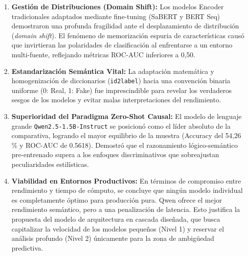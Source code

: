 \begin{enumerate}
    \item \textbf{Gestión de Distribuciones (Domain Shift):} Los modelos Encoder tradicionales adaptados mediante fine-tuning (SaBERT y BERT Seq) demostraron una profunda fragilidad ante el desplazamiento de distribución (\textit{domain shift}). El fenómeno de memorización espuria de características causó que invirtieran las polaridades de clasificación al enfrentarse a un entorno multi-fuente, reflejando métricas ROC-AUC inferiores a 0,50.
    \item \textbf{Estandarización Semántica Vital:} La adaptación matemática y homogenización de diccionarios (\texttt{id2label}) hacia una convención binaria uniforme (0: Real, 1: Fake) fue imprescindible para revelar los verdaderos sesgos de los modelos y evitar malas interpretaciones del rendimiento.
    \item \textbf{Superioridad del Paradigma Zero-Shot Causal:} El modelo de lenguaje grande \texttt{Qwen2.5-1.5B-Instruct} se posicionó como el líder absoluto de la comparativa, logrando el mayor equilibrio de la muestra (Accuracy del 54,26\,\% y ROC-AUC de 0.5618). Demostró que el razonamiento lógico-semántico pre-entrenado supera a los enfoques discriminativos que sobreajustan peculiaridades estilísticas.
    \item \textbf{Viabilidad en Entornos Productivos:} En términos de compromiso entre rendimiento y tiempo de cómputo, se concluye que ningún modelo individual es completamente óptimo para producción pura. Qwen ofrece el mejor rendimiento semántico, pero a una penalización de latencia. Esto justifica la propuesta del modelo de arquitectura en cascada diseñada, que busca capitalizar la velocidad de los modelos pequeños (Nivel 1) y reservar el análisis profundo (Nivel 2) únicamente para la zona de ambigüedad predictiva.
\end{enumerate}